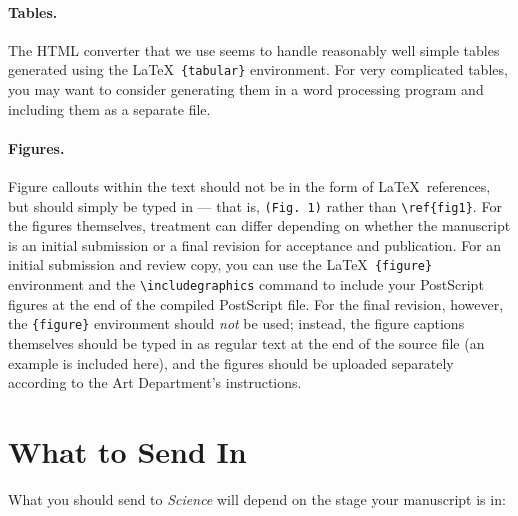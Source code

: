\documentclass[12pt]{article}
\begin{document}
\paragraph*{Tables.}  The HTML converter that we use seems to handle
reasonably well simple tables generated using the \LaTeX\
\texttt{\{tabular\}} environment.  For very complicated tables, you
may want to consider generating them in a word processing program and
including them as a separate file.

\paragraph*{Figures.}  Figure callouts within the text should not be
in the form of \LaTeX\ references, but should simply be typed in ---
that is, \verb+(Fig. 1)+ rather than \verb+\ref{fig1}+.  For the
figures themselves, treatment can differ depending on whether the
manuscript is an initial submission or a final revision for acceptance
and publication.  For an initial submission and review copy, you can
use the \LaTeX\ \verb+{figure}+ environment and the
\verb+\includegraphics+ command to include your PostScript figures at
the end of the compiled PostScript file.  For the final revision,
however, the \verb+{figure}+ environment should {\it not\/} be used;
instead, the figure captions themselves should be typed in as regular
text at the end of the source file (an example is included here), and
the figures should be uploaded separately according to the Art
Department's instructions.


\section*{What to Send In}

What you should send to {\it Science\/} will depend on the stage your manuscript is in:
\end{document}
